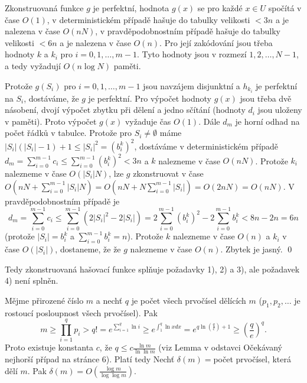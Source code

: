 \documentclass[a4paper,12pt]{article}
\begin{document}
Zkonstruovaná funkce $g$ je perfektní, 
hodnota $g(x)$ se pro každé $x\in U$ spočítá v čase $
O(1)$, 
v deterministickém přípa\-dě hašuje do tabulky velikosti 
$<3n$ a je nalezena v čase $O(nN)$, v pravděpodobnostním 
přípa\-dě hašuje do tabulky velikosti $<6n$ a je nalezena 
v čase $O(n)$. Pro její zak\'odování jsou třeba hodnoty $
k$ a 
$k_i$ pro $i=0,1,\dots,m-1$. Tyto hodnoty jsou v rozmezí 
$1,2,\dots,N-1$, a tedy vyžadují $O(n\log N)$ paměti.
\endproclaim

Protože $g(S_i)$ pro $i=0,1,\dots,m-1$ 
jsou navzájem disjunktní a $h_{k_i}$ je perfektní na $S_
i$, 
dostáváme, že $g$ je perfektní. Pro výpočet hodnoty $
g(x)$ 
jsou třeba dvě násobení, dvojí výpočet zbytku při 
dělení a jedno sčítání (hodnoty $d_i$ jsou uloženy v 
paměti). Proto výpočet $g(x)$ vyžaduje čas $O(1)$. Dále 
$d_m$ je horní odhad na počet řádků v tabulce. 
Protože pro $S_i\ne\emptyset$ máme $|S_i|(|S_i|-1)+1\le |S_
i|^2=(b_i^k)^2$, 
dostáváme v deterministickém případě 
$d_m=\sum_{i=0}^{m-1}c_i\le\sum_{i=0}^{m-1}(b_i^k)^2<3n$ a $k$ nalezneme v čase 
$O(nN)$. Protože $k_i$ nalezneme v čase $O(|S_i|N)$, lze $g$ 
zkonstruovat v čase 
$O(nN+\sum_{i=0}^{m-1}|S_i|N)=O(nN+N\sum_{i=0}^{m-1}|S_i|)=O(2nN)
=O(nN)$. 
V pravděpodob\-nostním případě je 
$$d_m=\sum_{i=0}^{m-1}c_i\le\sum_{i=0}^{m-1}(2|S_i|^2-2|S_i|)=2\sum_{
i=0}^{m-1}(b_i^k)^2-2\sum_{i=0}^{m-1}b_i^k<8n-2n=6n$$
(protože $|S_i|=b_i^k$ a $\sum_{i=0}^{m-1}b_i^k=n$). Protože $
k$ nalezneme v čase $O(n)$ a $k_i$ v čase $O(|S_i|)$, dostaneme, že 
že $g$ nalezneme v čase $O(n)$. Zbytek je jasný. \qed
\enddemo

Tedy zkonstruovaná hašovací funkce splňuje požadavky 
1), 2) a 3), ale požadavek 4) není splněn. 

Mějme přirozené číslo $m$ a nech\v t $q$ je počet všech prvočísel 
dělících $m$ ($p_1,p_2,\dots$ je rostoucí posloupnost všech 
prvočísel). Pak
$$m\ge\prod_{i=1}^qp_i>q!=e^{\sum_{i=1}^q\ln i}\ge e^{\int_1^q\ln 
xdx}=e^{q\ln(\frac qe)+1}\ge (\frac qe)^q.$$
Proto existuje konstanta $c$, že $q\le c\frac {\ln m}{\ln\ln m}$ (viz Lemma v odstavci Očekávaný 
nejhorší případ na stránce 6). Platí tedy  
Nech\v t $\delta (m)=$počet prvočísel, která dělí 
$m$. Pak $\delta (m)=O(\frac {\log m}{\log\log m})$.
\endproclaim
\end{document}
